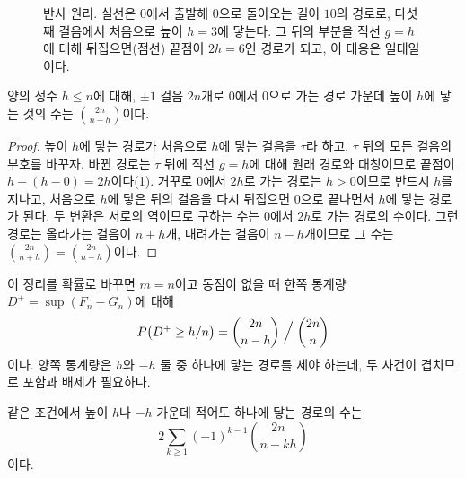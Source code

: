\begin{figure}[t]
\centering
{}
\caption{반사 원리. 실선은 $0$에서 출발해 $0$으로 돌아오는 길이 $10$의 경로로, 다섯째 걸음에서 처음으로 높이 $h=3$에 닿는다. 그 뒤의 부분을 직선 $g=h$에 대해 뒤집으면(점선) 끝점이 $2h=6$인 경로가 되고, 이 대응은 일대일이다.}
\label{fig:reflection}
\end{figure}

\begin{theorem}[반사 원리]
\label{thm:reflection}
양의 정수 $h\le n$에 대해, $\pm1$ 걸음 $2n$개로 $0$에서 $0$으로 가는 경로 가운데 높이 $h$에 닿는 것의 수는 $\binom{2n}{n-h}$이다.
\end{theorem}

\begin{proof}
높이 $h$에 닿는 경로가 처음으로 $h$에 닿는 걸음을 $\tau$라 하고, $\tau$ 뒤의 모든 걸음의 부호를 바꾸자. 바뀐 경로는 $\tau$ 뒤에 직선 $g=h$에 대해 원래 경로와 대칭이므로 끝점이 $h+(h-0)=2h$이다(\cref{fig:reflection}). 거꾸로 $0$에서 $2h$로 가는 경로는 $h>0$이므로 반드시 $h$를 지나고, 처음으로 $h$에 닿은 뒤의 걸음을 다시 뒤집으면 $0$으로 끝나면서 $h$에 닿는 경로가 된다. 두 변환은 서로의 역이므로 구하는 수는 $0$에서 $2h$로 가는 경로의 수이다. 그런 경로는 올라가는 걸음이 $n+h$개, 내려가는 걸음이 $n-h$개이므로 그 수는 $\binom{2n}{n+h}=\binom{2n}{n-h}$이다.
\end{proof}

이 정리를 확률로 바꾸면 $m=n$이고 동점이 없을 때 한쪽 통계량 $D^+=\sup(F_n-G_n)$에 대해
\[
P\bigl(D^+\ge h/n\bigr)=\binom{2n}{n-h}\Bigm/\binom{2n}n
\]
이다. 양쪽 통계량은 $h$와 $-h$ 둘 중 하나에 닿는 경로를 세야 하는데, 두 사건이 겹치므로 포함과 배제가 필요하다.

\begin{proposition}
\label{prop:two-sided-reflection}
같은 조건에서 높이 $h$나 $-h$ 가운데 적어도 하나에 닿는 경로의 수는
\[
2\sum_{k\ge1}(-1)^{k-1}\binom{2n}{n-kh}
\]
이다.
\end{proposition}

